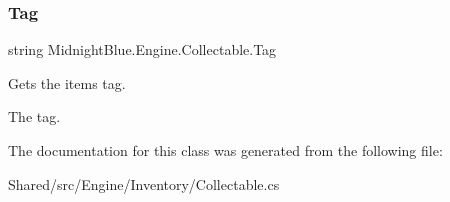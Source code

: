\subsubsection{\texorpdfstring{Tag}{Tag}}
{\footnotesize\ttfamily string Midnight\+Blue.\+Engine.\+Collectable.\+Tag\hspace{0.3cm}{\ttfamily [get]}}



Gets the items tag. 

The tag.

The documentation for this class was generated from the following file\+:\begin{DoxyCompactItemize}
\item 
Shared/src/\+Engine/\+Inventory/Collectable.\+cs\end{DoxyCompactItemize}

